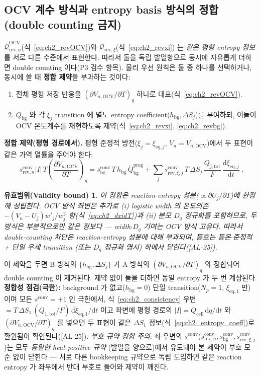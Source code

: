 \documentclass[11pt,a4paper]{article}
\newtheorem*{boundbox}{유효범위(Validity bound)}
\newcommand{\dd}{\mathrm{d}}
\newcommand{\eq}{\mathrm{eq}}
\newcommand{\bg}{\mathrm{bg}}
\newcommand{\cell}{\mathrm{cell}}
\newcommand{\OCV}{\mathrm{OCV}}
\newcommand{\tot}{\mathrm{tot}}
\newcommand{\rev}{\mathrm{rev}}
\newcommand{\conv}{\mathrm{conv}}
\newcommand{\prog}{\mathrm{prog}}
\newcommand{\AL}[1]{\textsf{[AL-#1]}}
\begin{document}
\subsection{OCV 계수 방식과 entropy basis 방식의 정합 (double counting 금지)}\label{sec:ch2_double}
$\dot{\mathcal Q}_{\rev,n}^{\OCV}$(식~\eqref{eq:ch2_revOCV})와 $\dot{\mathcal Q}_{\rev,\xi}$(식~\eqref{eq:ch2_revxi})
는 \emph{같은 평형 entropy 정보}를 서로 다른 수준에서 표현한다. 따라서 둘을 독립 발열항으로 동시에 자유롭게 더하면
double counting 이다(P3 검수 항목). 물리 우선 원칙은 둘 중 하나를 선택하거나, 동시에 쓸 때 \textbf{정합 제약}을
부과하는 것이다:
\begin{enumerate}[label=\Alph*),leftmargin=2.0em]
\item 전체 평형 저장 반응을 $(\partial V_{n,\OCV}/\partial T)_q$ 하나로 대표(식~\eqref{eq:ch2_revOCV}).
\item $Q_\bg$ 와 각 $\xi_j$ transition 에 별도 entropy coefficient($h_\bg,\Delta S_j$)를 부여하되, 이들이
  OCV 온도계수를 재현하도록 제약(식~\eqref{eq:ch2_revxi}, \eqref{eq:ch2_revbg}).
\end{enumerate}
\textbf{정합 제약(평형 경로에서).} 평형 준정적 방전($\xi_j=\xi_{\eq,j}$, $V_n=V_{n,\OCV}$)에서 두 표현이 같은
가역 열률을 주어야 한다:
\begin{equation}
\boxed{\;s_{\rev,n}^{\conv}|I|\,T\left(\frac{\partial V_{n,\OCV}}{\partial T}\right)_q
=s_\bg^{\conv}\,T\,h_\bg\,\dot Q_\bg^{\prog}
+\sum_{j}s_{\rev,\xi,j}^{\conv}\,T\,\Delta S_j\,\frac{Q_{j,\tot}}{F}\,\frac{\dd\xi_{\eq,j}}{\dd t}\;.}
\label{eq:ch2_consistency}
\end{equation}
\begin{boundbox}
이 정합은 \emph{reaction-entropy 성분($\propto\partial U_j/\partial T$)에 한정}해 성립한다. OCV 방식 좌변은 추가로
(i) logistic width 의 온도의존 $-(V_n-U_j)w'_j/w_j^2$ 항(식~\eqref{eq:ch2_dxidT})과 (ii) 분모 $D_q$ 정규화를
포함하므로, 두 방식은 \emph{부분적으로만} 같은 정보다 — width$\cdot D_q$ 기여는 OCV 방식 고유다. 따라서
double-counting 차단은 reaction-entropy 성분에 대해 부과되며, 등호는 등온$\cdot$준정적 + 단일 우세 transition
(또는 $D_q$ 정규화 명시) 하에서 닫힌다(\AL{25}).
\end{boundbox}
이 제약을 두면 B 방식의 $\{h_\bg,\Delta S_j\}$ 가 A 방식의 $(\partial V_{n,\OCV}/\partial T)_q$ 와 정합되어
double counting 이 제거된다. 제약 없이 둘을 더하면 동일 entropy 가 두 번 계상된다. \textbf{정합성 점검(극한):}
background 가 없고($h_\bg=0$) 단일 transition($N_p=1$, $\xi_{\eq,1}$ 만) 이며 모든 $s^{\conv}=+1$ 인 극한에서,
식~\eqref{eq:ch2_consistency} 우변 $=T\,\Delta S_1\,(Q_{1,\tot}/F)\,\dd\xi_{\eq,1}/\dd t$ 이고 좌변에 평형
경로의 $|I|=Q_\cell\,\dd q/\dd t$ 와 $(\partial V_{n,\OCV}/\partial T)_q$ 를 넣으면 두 표현이 같은 $\Delta S_1$
정보(식~\eqref{eq:ch2_entropy_coeff})로 환원됨이 확인된다(\AL{25}). \emph{부호 규약 정합 주의}: 좌$\cdot$우변의
$s^{\conv}$($s_{\rev,n}^{\conv},s_\bg^{\conv},s_{\rev,\xi,j}^{\conv}$)는 모두 \emph{동일한 heat-positive 규약}
(발열을 양으로)에서 유도돼야 본 제약이 부호 모순 없이 닫힌다 — 서로 다른 bookkeeping 규약으로 독립 도입하면 같은
reaction entropy 가 좌우에서 반대 부호로 들어와 제약이 깨진다.
\end{document}

